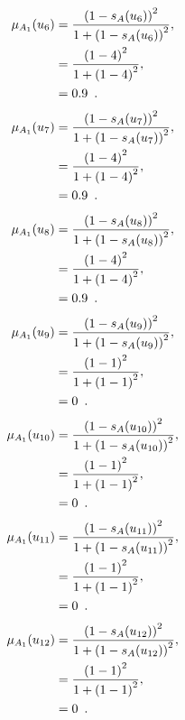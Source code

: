 \documentclass[a4paper,openany]{book}
\begin{document}
				\begin{align}
					\mu_{A_1}(u_6) &= \frac{\left(1-s_A(u_6)\right)^2}{1 + \left(1-s_A(u_6)\right)^2} ,\\
					&= \frac{\left(1-4\right)^2}{1 + \left(1-4\right)^2} \notag ,\\
					&= 0.9 \enspace. \notag
				\end{align}
				\begin{align}
					\mu_{A_1}(u_7) &= \frac{\left(1-s_A(u_7)\right)^2}{1 + \left(1-s_A(u_7)\right)^2} ,\\
					&= \frac{\left(1-4\right)^2}{1 + \left(1-4\right)^2} \notag ,\\
					&= 0.9 \enspace. \notag
				\end{align}
				\begin{align}
					\mu_{A_1}(u_8) &= \frac{\left(1-s_A(u_8)\right)^2}{1 + \left(1-s_A(u_8)\right)^2} ,\\
					&= \frac{\left(1-4\right)^2}{1 + \left(1-4\right)^2} \notag ,\\
					&= 0.9 \enspace. \notag
				\end{align}
				\begin{align}
					\mu_{A_1}(u_9) &= \frac{\left(1-s_A(u_9)\right)^2}{1 + \left(1-s_A(u_9)\right)^2} ,\\
					&= \frac{\left(1-1\right)^2}{1 + \left(1-1\right)^2} \notag ,\\
					&= 0 \enspace. \notag
				\end{align}
				\begin{align}
					\mu_{A_1}(u_{10}) &= \frac{\left(1-s_A(u_{10})\right)^2}{1 + \left(1-s_A(u_{10})\right)^2} ,\\
					&= \frac{\left(1-1\right)^2}{1 + \left(1-1\right)^2} \notag ,\\
					&= 0 \enspace. \notag
				\end{align}
				\begin{align}
					\mu_{A_1}(u_{11}) &= \frac{\left(1-s_A(u_{11})\right)^2}{1 + \left(1-s_A(u_{11})\right)^2} ,\\
					&= \frac{\left(1-1\right)^2}{1 + \left(1-1\right)^2} \notag ,\\
					&= 0 \enspace. \notag
				\end{align}
				\begin{align}
					\mu_{A_1}(u_{12}) &= \frac{\left(1-s_A(u_{12})\right)^2}{1 + \left(1-s_A(u_{12})\right)^2} ,\\
					&= \frac{\left(1-1\right)^2}{1 + \left(1-1\right)^2} \notag ,\\
					&= 0 \enspace. \notag
				\end{align}
\end{document}
